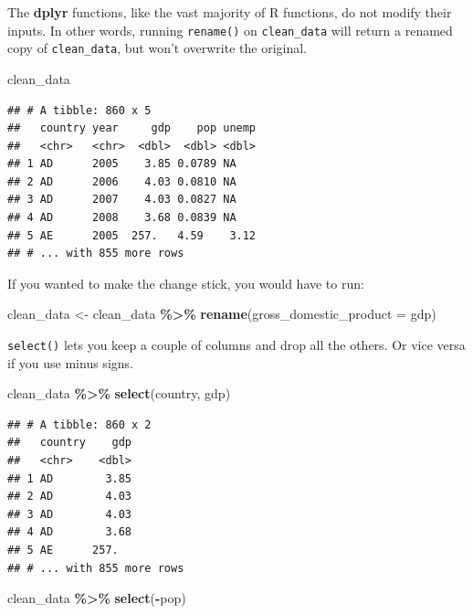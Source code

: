 \documentclass[
  12pt,
  oneside,openany]{book}
\newenvironment{Shaded}{\begin{snugshade}}{\end{snugshade}}
\newcommand{\DataTypeTok}[1]{\textcolor[rgb]{0.13,0.29,0.53}{#1}}
\newcommand{\KeywordTok}[1]{\textcolor[rgb]{0.13,0.29,0.53}{\textbf{#1}}}
\newcommand{\NormalTok}[1]{#1}
\newcommand{\OperatorTok}[1]{\textcolor[rgb]{0.81,0.36,0.00}{\textbf{#1}}}
\newcommand{\StringTok}[1]{\textcolor[rgb]{0.31,0.60,0.02}{#1}}
\begin{document}
The \textbf{dplyr} functions, like the vast majority of R functions, do not modify their inputs. In other words, running \texttt{rename()} on \texttt{clean\_data} will return a renamed copy of \texttt{clean\_data}, but won't overwrite the original.

\begin{Shaded}
\begin{Highlighting}[]
\NormalTok{clean\_data}
\end{Highlighting}
\end{Shaded}

\begin{verbatim}
## # A tibble: 860 x 5
##   country year     gdp    pop unemp
##   <chr>   <chr>  <dbl>  <dbl> <dbl>
## 1 AD      2005    3.85 0.0789 NA   
## 2 AD      2006    4.03 0.0810 NA   
## 3 AD      2007    4.03 0.0827 NA   
## 4 AD      2008    3.68 0.0839 NA   
## 5 AE      2005  257.   4.59    3.12
## # ... with 855 more rows
\end{verbatim}

If you wanted to make the change stick, you would have to run:

\begin{Shaded}
\begin{Highlighting}[]
\NormalTok{clean\_data <{-}}\StringTok{ }\NormalTok{clean\_data }\OperatorTok{\%>\%}
\StringTok{  }\KeywordTok{rename}\NormalTok{(}\DataTypeTok{gross\_domestic\_product =}\NormalTok{ gdp)}
\end{Highlighting}
\end{Shaded}

\texttt{select()} lets you keep a couple of columns and drop all the others. Or vice versa if you use minus signs.

\begin{Shaded}
\begin{Highlighting}[]
\NormalTok{clean\_data }\OperatorTok{\%>\%}
\StringTok{  }\KeywordTok{select}\NormalTok{(country, gdp)}
\end{Highlighting}
\end{Shaded}

\begin{verbatim}
## # A tibble: 860 x 2
##   country    gdp
##   <chr>    <dbl>
## 1 AD        3.85
## 2 AD        4.03
## 3 AD        4.03
## 4 AD        3.68
## 5 AE      257.  
## # ... with 855 more rows
\end{verbatim}

\begin{Shaded}
\begin{Highlighting}[]
\NormalTok{clean\_data }\OperatorTok{\%>\%}
\StringTok{  }\KeywordTok{select}\NormalTok{(}\OperatorTok{{-}}\NormalTok{pop)}
\end{Highlighting}
\end{Shaded}
\end{document}
